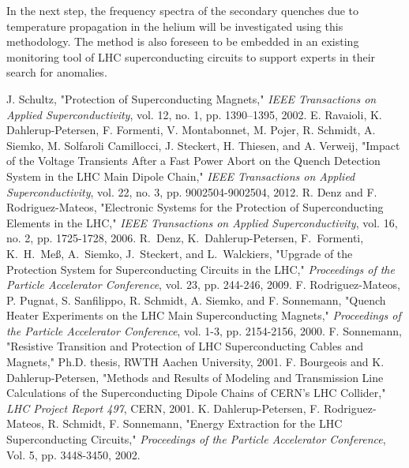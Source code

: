 \documentclass[lettersize,journal]{IEEEtran}
\begin{document}
In the next step, the frequency spectra of the secondary quenches due to temperature propagation in the helium will be investigated using this methodology. 
The method is also foreseen to be embedded in an existing monitoring tool of LHC superconducting circuits to support experts in their search for anomalies.


\begin{thebibliography}{1}


J. Schultz, "Protection of Superconducting Magnets," \textit{IEEE Transactions on Applied Superconductivity}, vol. 12, no. 1, pp. 1390–1395, 2002.
E. Ravaioli, K. Dahlerup-Petersen, F. Formenti, V. Montabonnet, M. Pojer, R. Schmidt, A. Siemko, M. Solfaroli Camillocci, J. Steckert, H. Thiesen, and A. Verweij, "Impact of the Voltage Transients After a Fast Power Abort on the Quench Detection System in the LHC Main Dipole Chain," \textit{IEEE Transactions on Applied Superconductivity}, vol. 22, no. 3, pp. 9002504-9002504, 2012.
R. Denz and F. Rodriguez-Mateos, "Electronic Systems for the Protection of Superconducting Elements in the LHC," \textit{IEEE Transactions on Applied Superconductivity}, vol. 16, no. 2, pp. 1725-1728, 2006.
R.~Denz, K.~Dahlerup-Petersen, F.~Formenti, K.~H.~Meß, A.~Siemko, J.~Steckert, and L.~Walckiers, "Upgrade of the Protection System for Superconducting Circuits in the LHC," \textit{Proceedings of the Particle Accelerator Conference}, vol. 23, pp. 244-246, 2009.
F. Rodriguez-Mateos, P. Pugnat, S. Sanfilippo, R. Schmidt, A. Siemko, and F. Sonnemann, "Quench Heater Experiments on the LHC Main Superconducting Magnets," \textit{Proceedings of the Particle Accelerator Conference}, vol. 1-3, pp. 2154-2156, 2000. 
F. Sonnemann, "{Resistive Transition and Protection of LHC Superconducting Cables and Magnets}," Ph.D. thesis, RWTH Aachen University, 2001.
F. Bourgeois and K. Dahlerup-Petersen, "Methods and Results of Modeling and Transmission Line Calculations of the Superconducting Dipole Chains of CERN’s LHC Collider," \textit{LHC Project Report 497}, CERN, 2001.
K. Dahlerup-Petersen, F. Rodriguez-Mateos, R. Schmidt, F. Sonnemann, "Energy Extraction for the LHC Superconducting Circuits," \textit{Proceedings of the Particle Accelerator Conference}, Vol. 5, pp. 3448-3450, 2002.

\end{thebibliography}
\end{document}
